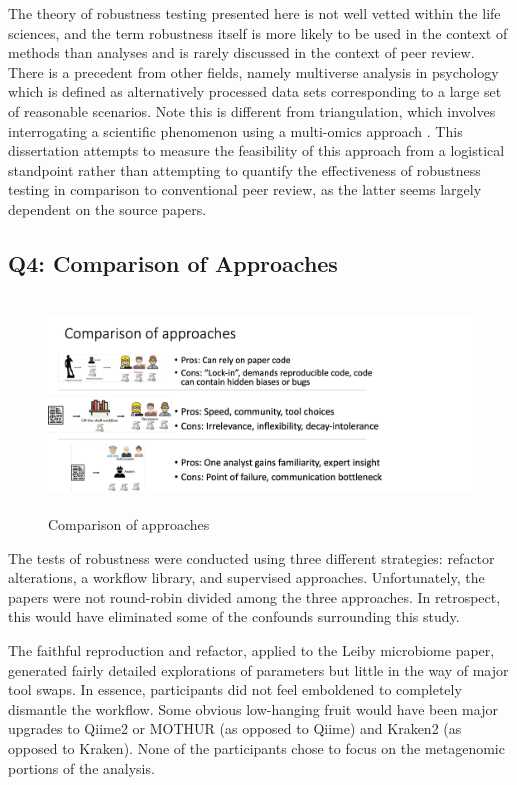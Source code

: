 \documentclass{drexelthesis}
\begin{document}
The theory of robustness testing presented here is not well vetted within the life sciences, and the term robustness itself is more likely to be used in the context of methods than analyses and is rarely discussed in the context of peer review. There is a precedent from other fields, namely multiverse analysis in psychology \cite{Steegen2016-zx} which is defined as alternatively processed data sets corresponding to a large set of reasonable scenarios. Note this is different from triangulation, which involves interrogating a scientific phenomenon using a multi-omics approach \cite{noauthor_undated-xz}. This dissertation attempts to measure the feasibility of this approach from a logistical standpoint rather than attempting to quantify the effectiveness of robustness testing in comparison to conventional peer review, as the latter seems largely dependent on the source papers.

\subsection{Q4: Comparison of Approaches}

\begin{figure}[h!]
	\centering
	\includegraphics[width=13.76cm,height=5.68cm]{./images/approachcomparison.png}
	\caption{Comparison of approaches}
	\label{approachcomparison}
\end{figure}

The tests of robustness were conducted using three different strategies: refactor alterations, a workflow library, and supervised approaches. Unfortunately, the papers were not round-robin divided among the three approaches. In retrospect, this would have eliminated some of the confounds surrounding this study.

The faithful reproduction and refactor, applied to the Leiby microbiome paper, generated fairly detailed explorations of parameters but little in the way of major tool swaps. In essence, participants did not feel emboldened to completely dismantle the workflow. Some obvious low-hanging fruit would have been major upgrades to Qiime2 or MOTHUR (as opposed to Qiime) and Kraken2 (as opposed to Kraken). None of the participants chose to focus on the metagenomic portions of the analysis.
\end{document}
